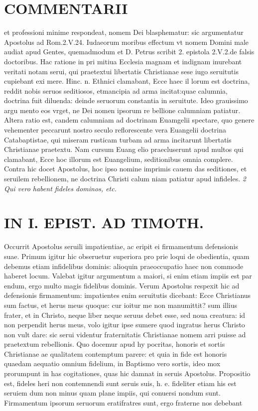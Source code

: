 \documentclass{article}
\begin{document}
\begin{pages}
\section*{COMMENTARII }
\marginpar{[ p.146 ]}\pstart et professioni minime respondeat, nomem Dei blasphematur: sic argumentatur Apostolus ad Rom.2.V.24. Iudaeorum moribus effectum vt nomem Domini male audiat apud Gentes, quemadmodum et D. Petrus scribit 2. epistola 2.V.2.de falsis doctoribus. Hac ratione in pri mitiua Ecclesia magnam et indignam inurebant veritati notam serui, qui praetextui libertatis Christianae sese iugo seruitutis cupiebant exi mere. Hinc. n. Ethnici clamabant, Ecce haec il lorum est doctrina, reddit nobis seruos seditiosos, etmancipia ad arma incitat:quae calumnia, doctrina fuit diluenda: deinde seruorum constantia in seruitute. Ideo grauissimo argu mento eos vrget, ne Dei nomen ipsorum re bellione calumniam patiatur. Altera ratio est, candem calumniam ad doctrinam Euamgelii spectare, quo genere vehementer peccarunt nostro seculo reflorescente vera Euangelii doctrina Catabaptistae, qui miseram rusticam turbam ad arma incitarunt libertatis Christianae praetextu. Nam cursum Euang elio praecluserunt apud multos qui clamabant, Ecce hoc illorum est Euangelium, seditionibus omnia complere. Contra hic docet Apostolus, hoc ipso nomine imprimis cauem das seditiones, et seruilem rebellionem, ne doctrina Christi calum niam patiatur apud infideles.  \pend
\textit{2 Qui vero habent fideles dominos, etc. }
\section*{IN I. EPIST. AD TIMOTH. }
\marginpar{[ p.147 ]}\pstart Occurrit Apostolus seruili impatientiae, ac eripit ei firmamentum defensionis suae. Primum igitur hic obseruetur superiora pro prie loqui de obedientia, quam debemus etiam infidelibus dominis: alioquin praeoccupatio haec non commode haberet locum. Valebat igitur argumentum a maiori, si enim etiam impiis est par endum, ergo multo magis fidelibus dominis. Verum Apostolus respexit hic ad defensionis firmamentum: impatientes enim seruitutis dicebant: Ecce Christianus sum factus, et herus meus quoque: cur ioitur me non manumittit? sum illius frater, et in Christo, neque liber neque seruus debet esse, sed noua creatura: id non perpendit herus meus, volo igitur ipse sumere quod ingratus herus Christo non vult dare: sic serui videntur fraternitatis Christianae nomem arri puisse ad praetextum rebellionis. Quo docemur apud hy pocritas, honoris et sortis Christianae ae qualitatem contemptum parere: et quia in fide est honoris quaedam aequatio omnium fidelium, in Baptismo vero sortis, ideo mox prorumpunt in has cogitationes, quas hic damnat in seruis Apostolus. Propositio est, fideles heri non contemnendi sunt seruis suis, h. e. fideliter etiam his est seruiem dum non minus quam plane impiis, qui conuersi  \pend\pstart nondum sunt. Firmamentum ipsorum seruorum eratifratres sunt, ergo fraterne nos debebant  \pend

\end{pages}
\end{document}
